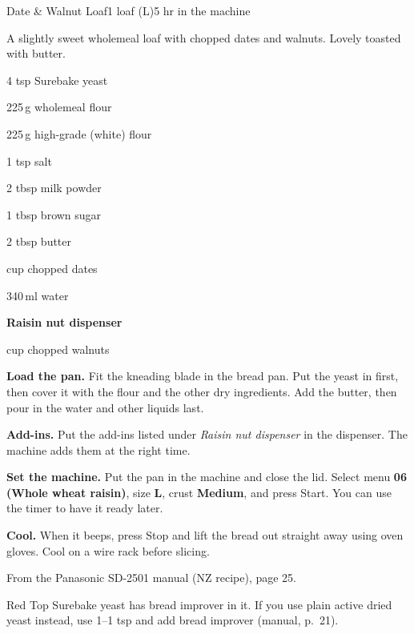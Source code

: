 \begin{recipebox}{Date \& Walnut Loaf}{1 loaf (L)}{5 hr in the machine}

A slightly sweet wholemeal loaf with chopped dates and walnuts. Lovely toasted with butter.

\begin{ingredients}
  \item 4 tsp Surebake yeast
  \item 225\,g wholemeal flour
  \item 225\,g high-grade (white) flour
  \item 1 tsp salt
  \item 2 tbsp milk powder
  \item 1 tbsp brown sugar
  \item 2 tbsp butter
  \item {} cup chopped dates
  \item 340\,ml water
  \item[] \textbf{Raisin nut dispenser}
  \item {} cup chopped walnuts
\end{ingredients}

\begin{method}
  \item \textbf{Load the pan.} Fit the kneading blade in the bread pan. Put the yeast in first, then cover it with the flour and the other dry ingredients. Add the butter, then pour in the water and other liquids last.
  \item \textbf{Add-ins.} Put the add-ins listed under \emph{Raisin nut dispenser} in the dispenser. The machine adds them at the right time.
  \item \textbf{Set the machine.} Put the pan in the machine and close the lid. Select menu \textbf{06 (Whole wheat raisin)}, size \textbf{L}, crust \textbf{Medium}, and press Start. You can use the timer to have it ready later.
  \item \textbf{Cool.} When it beeps, press Stop and lift the bread out straight away using oven gloves. Cool on a wire rack before slicing.
\end{method}

\begin{notelist}
  \item From the Panasonic SD-2501 manual (NZ recipe), page 25.
  \item Red Top Surebake yeast has bread improver in it. If you use plain active dried yeast instead, use 1--1 tsp and add bread improver (manual, p.~21).
\end{notelist}

\end{recipebox}
